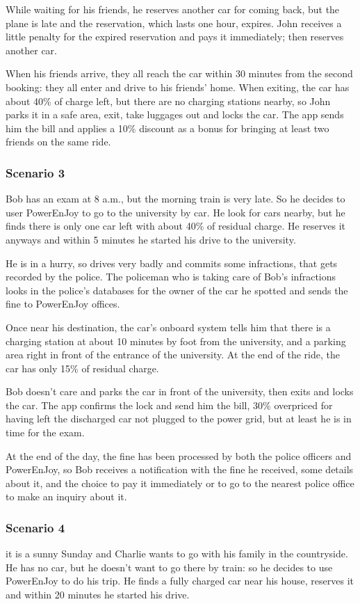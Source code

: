 \documentclass[11pt]{article} %
\newcommand{\pe}{PowerEnJoy }
\newcommand{\pecomma}{PowerEnJoy, }
\begin{document}
While waiting for his friends, he reserves another car for coming back, but the plane is late and the reservation, which lasts one hour, expires. John receives a little penalty for the expired reservation and pays it immediately; then reserves another car.

When his friends arrive, they all reach the car within 30 minutes from the second booking: they all enter and drive to his friends' home. When exiting, the car has about 40\% of charge left, but there are no charging stations nearby, so John parks it in a safe area, exit, take luggages out and locks the car. The app sends him the bill and applies a 10\% discount as a bonus for bringing at least two friends on the same ride.


\subsubsection{Scenario 3}
Bob has an exam at 8 a.m., but the morning train is very late. So he decides to user \pe to go to the university by car. He look for cars nearby, but he finds there is only one car left with about 40\% of residual charge. He reserves it anyways and within 5 minutes he started his drive to the university.

He is in a hurry, so drives very badly and commits some infractions, that gets recorded by the police. The policeman who is taking care of Bob's infractions looks in the police's databases for the owner of the car he spotted and sends the fine to \pe offices.

Once near his destination, the car's onboard system tells him that there is a charging station at about 10 minutes by foot from the university, and a parking area right in front of the entrance of the university. At the end of the ride, the car has only 15\% of residual charge.

Bob doesn't care and parks the car in front of the university, then exits and locks the car. The app confirms the lock and send him the bill, 30\% overpriced for having left the discharged car not plugged to the power grid, but at least he is in time for the exam.

At the end of the day, the fine has been processed by both the police officers and \pecomma so Bob receives a notification with the fine he received, some details about it, and the choice to pay it immediately or to go to the nearest police office to make an inquiry about it.


\subsubsection{Scenario 4}
it is a sunny Sunday and Charlie wants to go with his family in the countryside. He has no car, but he doesn't want to go there by train: so he decides to use \pe to do his trip. He finds a fully charged car near his house, reserves it and within 20 minutes he started his drive.
\end{document}
